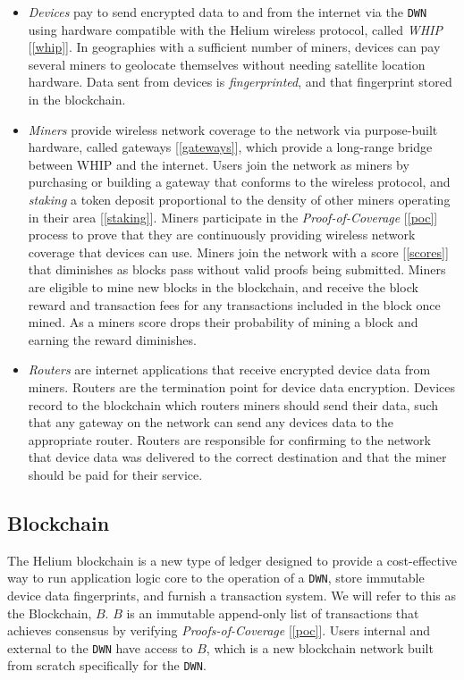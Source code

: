 \documentclass[letterpaper,11pt]{article}
\begin{document}
\begin{itemize}
    \item \emph{Devices} pay to send encrypted data to and from the internet via the \verb|DWN| using hardware compatible with the Helium wireless protocol, called \emph{WHIP} [\ref{whip}]. In geographies with a sufficient number of miners, devices can pay several miners to geolocate themselves without needing satellite location hardware. Data sent from devices is \emph{fingerprinted}, and that fingerprint stored in the blockchain.
    \item \emph{Miners} provide wireless network coverage to the network via purpose-built hardware, called gateways [\ref{gateways}], which provide a long-range bridge between WHIP and the internet. Users join the network as miners by purchasing or building a gateway that conforms to the wireless protocol, and \emph{staking} a token deposit proportional to the density of other miners operating in their area [\ref{staking}]. Miners participate in the \emph{Proof-of-Coverage} [\ref{poc}] process to prove that they are continuously providing wireless network coverage that devices can use. Miners join the network with a score [\ref{scores}] that diminishes as blocks pass without valid proofs being submitted. Miners are eligible to mine new blocks in the blockchain, and receive the block reward and transaction fees for any transactions included in the block once mined. As a miners score drops their probability of mining a block and earning the reward diminishes.
    \item \emph{Routers} are internet applications that receive encrypted device data from miners. Routers are the termination point for device data encryption. Devices record to the blockchain which routers miners should send their data, such that any gateway on the network can send any devices data to the appropriate router. Routers are responsible for confirming to the network that device data was delivered to the correct destination and that the miner should be paid for their service.
\end{itemize}

\subsection{Blockchain}

The Helium blockchain is a new type of ledger designed to provide a cost-effective way to run application logic core to the operation of a \verb|DWN|, store immutable device data fingerprints, and furnish a transaction system. We will refer to this as the Blockchain, $B$. $B$ is an immutable append-only list of transactions that achieves consensus by verifying \emph{Proofs-of-Coverage} [\ref{poc}]. Users internal and external to the \verb|DWN| have access to $B$, which is a new blockchain network built from scratch specifically for the \verb|DWN|.
\end{document}
